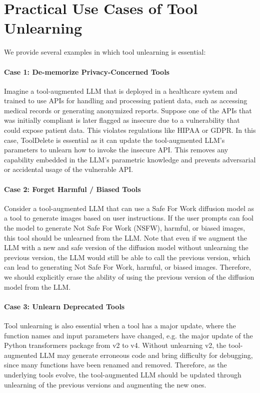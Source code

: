 \section{Practical Use Cases of Tool Unlearning}\label{sec:example}
We provide several examples in which tool unlearning is essential:

\paragraph{Case 1: De-memorize Privacy-Concerned Tools} Imagine a tool-augmented LLM that is deployed in a healthcare system and trained to use APIs for handling and processing patient data, such as accessing medical records or generating anonymized reports. Suppose one of the APIs that was initially compliant is later flagged as insecure due to a vulnerability that could expose patient data. This violates regulations like HIPAA or GDPR. In this case, ToolDelete is essential as it can update the tool-augmented LLM's parameters to unlearn how to invoke the insecure API. This removes any capability embedded in the LLM's parametric knowledge and prevents adversarial or accidental usage of the vulnerable API.

\paragraph{Case 2: Forget Harmful / Biased Tools} Consider a tool-augmented LLM that can use a Safe For Work diffusion model as a tool to generate images based on user instructions. If the user prompts can fool the model to generate Not Safe For Work (NSFW), harmful, or biased images, this tool should be unlearned from the LLM. Note that even if we augment the LLM with a new and safe version of the diffusion model without unlearning the previous version, the LLM would still be able to call the previous version, which can lead to generating Not Safe For Work, harmful, or biased images. Therefore, we should explicitly erase the ability of using the previous version of the diffusion model from the LLM. 

\paragraph{Case 3: Unlearn Deprecated Tools} Tool unlearning is also essential when a tool has a major update, where the function names and input parameters have changed, e.g. the major update of the Python transformers package from v2 to v4. Without unlearning v2, the tool-augmented LLM may generate erroneous code and bring difficulty for debugging, since many functions have been renamed and removed. Therefore, as the underlying tools evolve, the tool-augmented LLM should be updated through unlearning of the previous versions and augmenting the new ones.


